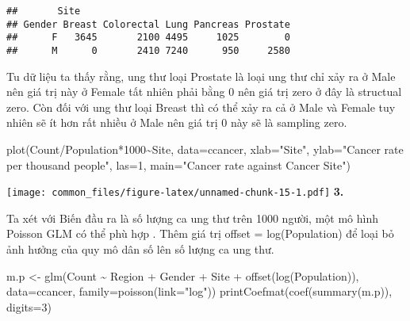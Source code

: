 \documentclass[
]{article}
\newenvironment{Shaded}{\begin{snugshade}}{\end{snugshade}}
\newcommand{\AttributeTok}[1]{\textcolor[rgb]{0.77,0.63,0.00}{#1}}
\newcommand{\DecValTok}[1]{\textcolor[rgb]{0.00,0.00,0.81}{#1}}
\newcommand{\FunctionTok}[1]{\textcolor[rgb]{0.00,0.00,0.00}{#1}}
\newcommand{\NormalTok}[1]{#1}
\newcommand{\OtherTok}[1]{\textcolor[rgb]{0.56,0.35,0.01}{#1}}
\newcommand{\SpecialCharTok}[1]{\textcolor[rgb]{0.00,0.00,0.00}{#1}}
\newcommand{\StringTok}[1]{\textcolor[rgb]{0.31,0.60,0.02}{#1}}
\begin{document}
\begin{verbatim}
##       Site
## Gender Breast Colorectal Lung Pancreas Prostate
##      F   3645       2100 4495     1025        0
##      M      0       2410 7240      950     2580
\end{verbatim}

Tu dữ liệu ta thấy rằng, ung thư loại Prostate là loại ung thư chỉ xảy
ra ở Male nên giá trị này ở Female tất nhiên phải bằng 0 nên giá trị
zero ở đây là structual zero. Còn đối với ung thư loại Breast thì có thể
xảy ra cả ở Male và Female tuy nhiên sẽ ít hơn rất nhiều ở Male nên giá
trị 0 này sẽ là sampling zero.

\begin{Shaded}
\begin{Highlighting}[]
\FunctionTok{plot}\NormalTok{(Count}\SpecialCharTok{/}\NormalTok{Population}\SpecialCharTok{*}\DecValTok{1000}\SpecialCharTok{\textasciitilde{}}\NormalTok{Site, }\AttributeTok{data=}\NormalTok{ccancer, }\AttributeTok{xlab=}\StringTok{"Site"}\NormalTok{, }\AttributeTok{ylab=}\StringTok{"Cancer rate per thousand people"}\NormalTok{, }\AttributeTok{las=}\DecValTok{1}\NormalTok{, }\AttributeTok{main=}\StringTok{"Cancer rate against Cancer Site"}\NormalTok{)}
\end{Highlighting}
\end{Shaded}

\texttt{[image: common\_files/figure-latex/unnamed-chunk-15-1.pdf]}
\textbf{3.}

Ta xét với Biến đầu ra là số lượng ca ung thư trên 1000 người, một mô
hình Poisson GLM có thể phù hợp . Thêm giá trị offset = log(Population)
để loại bỏ ảnh hưởng của quy mô dân số lên số lượng ca ung thư.

\begin{Shaded}
\begin{Highlighting}[]
\NormalTok{m.p }\OtherTok{\textless{}{-}} \FunctionTok{glm}\NormalTok{(Count }\SpecialCharTok{\textasciitilde{}}\NormalTok{ Region }\SpecialCharTok{+}\NormalTok{ Gender }\SpecialCharTok{+}\NormalTok{ Site }\SpecialCharTok{+} \FunctionTok{offset}\NormalTok{(}\FunctionTok{log}\NormalTok{(Population)), }\AttributeTok{data=}\NormalTok{ccancer, }\AttributeTok{family=}\FunctionTok{poisson}\NormalTok{(}\AttributeTok{link=}\StringTok{"log"}\NormalTok{))}
\FunctionTok{printCoefmat}\NormalTok{(}\FunctionTok{coef}\NormalTok{(}\FunctionTok{summary}\NormalTok{(m.p)), }\AttributeTok{digits=}\DecValTok{3}\NormalTok{)}
\end{Highlighting}
\end{Shaded}
\end{document}
